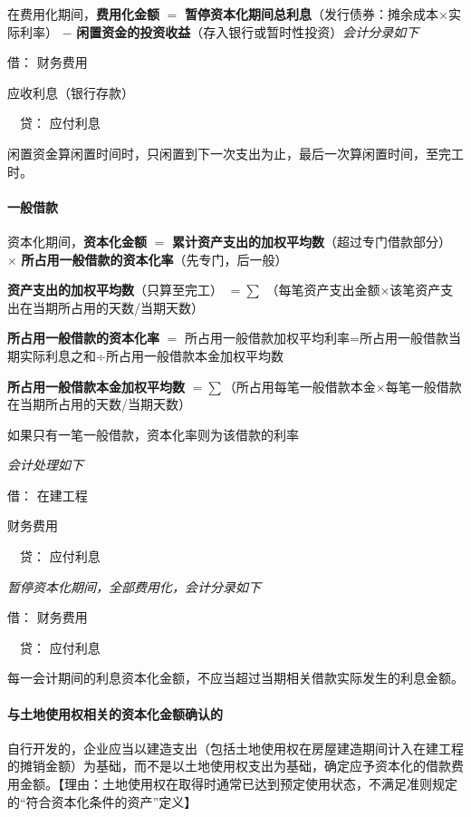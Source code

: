 \documentclass[UTF8,12pt]{ctexart}
\newenvironment{Dr}{\noindent 借：}{\par}
\newenvironment{Cr}{\noindent \ \ 贷：}{\par}
\numberwithin{equation}{section} %
\numberwithin{figure}{section}
\numberwithin{table}{section}
\begin{document}
	在费用化期间，\textbf{费用化金额} $=$ \textbf{暂停资本化期间总利息}（发行债券：摊余成本×实际利率） $-$ \textbf{闲置资金的投资收益}（存入银行或暂时性投资）\textit{会计分录如下}
	
	\begin{Dr}
		财务费用
		
		应收利息（银行存款）
	\end{Dr}
	\begin{Cr}
		应付利息
	\end{Cr}
	
	闲置资金算闲置时间时，只闲置到下一次支出为止，最后一次算闲置时间，至完工时。
	
	\paragraph{一般借款}
	资本化期间，\textbf{资本化金额} $=$ \textbf{累计资产支出的加权平均数}（超过专门借款部分） $\times$ \textbf{所占用一般借款的资本化率}（先专门，后一般）
	
	\textbf{资产支出的加权平均数}（只算至完工） $=\sum$ （每笔资产支出金额×该笔资产支出在当期所占用的天数/当期天数）
	
	\textbf{所占用一般借款的资本化率} $=$ 所占用一般借款加权平均利率=所占用一般借款当期实际利息之和÷所占用一般借款本金加权平均数
	
	\textbf{所占用一般借款本金加权平均数} $=\sum$（所占用每笔一般借款本金×每笔一般借款在当期所占用的天数/当期天数）
	
	如果只有一笔一般借款，资本化率则为该借款的利率
	
	\textit{会计处理如下}
	
	\begin{Dr}
		在建工程
		
		财务费用
	\end{Dr}
	\begin{Cr}
		应付利息
	\end{Cr}

	\textit{暂停资本化期间，全部费用化，会计分录如下}
	
	\begin{Dr}
		财务费用
	\end{Dr}
	\begin{Cr}
		应付利息
	\end{Cr}

	每一会计期间的利息资本化金额，不应当超过当期相关借款实际发生的利息金额。
	
	\paragraph{与土地使用权相关的资本化金额确认的}
	自行开发的，企业应当以建造支出（包括土地使用权在房屋建造期间计入在建工程的摊销金额）为基础，而不是以土地使用权支出为基础，确定应予资本化的借款费用金额。【理由：土地使用权在取得时通常已达到预定使用状态，不满足准则规定的“符合资本化条件的资产”定义】
	
\end{document}
